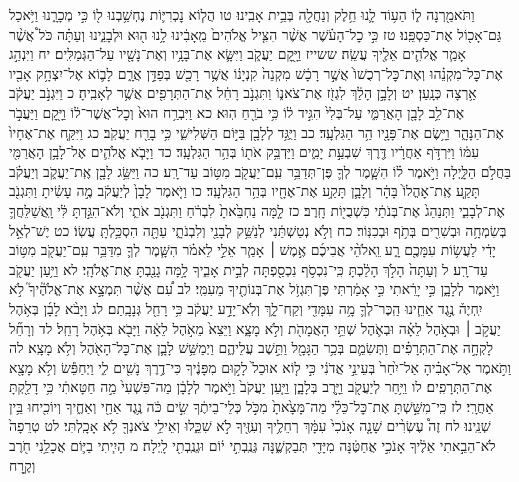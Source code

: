 \documentclass[twoside, openany, parskip=half, 11pt]{book}
\begin{document}
וַתֹּאמַ֖רְנָה ל֑וֹ הַע֥וֹד לָ֛נוּ חֵ֥לֶק וְנַחֲלָ֖ה בְּבֵ֥ית אָבִֽינוּ׃ טו הֲל֧וֹא נׇכְרִיּ֛וֹת נֶחְשַׁ֥בְנוּ ל֖וֹ כִּ֣י מְכָרָ֑נוּ וַיֹּ֥אכַל גַּם־אָכ֖וֹל אֶת־כַּסְפֵּֽנוּ׃ טז כִּ֣י כׇל־הָעֹ֗שֶׁר אֲשֶׁ֨ר הִצִּ֤יל אֱלֹהִים֙ מֵֽאָבִ֔ינוּ לָ֥נוּ ה֖וּא וּלְבָנֵ֑ינוּ וְעַתָּ֗ה כֹּל֩ אֲשֶׁ֨ר אָמַ֧ר אֱלֹהִ֛ים אֵלֶ֖יךָ עֲשֵֽׂה׃ ששייז וַיָּ֖קׇם יַעֲקֹ֑ב וַיִּשָּׂ֛א אֶת־בָּנָ֥יו וְאֶת־נָשָׁ֖יו עַל־הַגְּמַלִּֽים׃ יח וַיִּנְהַ֣ג אֶת־כׇּל־מִקְנֵ֗הוּ וְאֶת־כׇּל־רְכֻשׁוֹ֙ אֲשֶׁ֣ר רָכָ֔שׁ מִקְנֵה֙ קִנְיָנ֔וֹ אֲשֶׁ֥ר רָכַ֖שׁ בְּפַדַּ֣ן אֲרָ֑ם לָב֛וֹא אֶל־יִצְחָ֥ק אָבִ֖יו אַ֥רְצָה כְּנָֽעַן׃ יט וְלָבָ֣ן הָלַ֔ךְ לִגְזֹ֖ז אֶת־צֹאנ֑וֹ וַתִּגְנֹ֣ב רָחֵ֔ל אֶת־הַתְּרָפִ֖ים אֲשֶׁ֥ר לְאָבִֽיהָ׃ כ וַיִּגְנֹ֣ב יַעֲקֹ֔ב אֶת־לֵ֥ב לָבָ֖ן הָאֲרַמִּ֑י עַל־בְּלִי֙ הִגִּ֣יד ל֔וֹ כִּ֥י בֹרֵ֖חַ הֽוּא׃ כא וַיִּבְרַ֥ח הוּא֙ וְכׇל־אֲשֶׁר־ל֔וֹ וַיָּ֖קׇם וַיַּעֲבֹ֣ר אֶת־הַנָּהָ֑ר וַיָּ֥שֶׂם אֶת־פָּנָ֖יו הַ֥ר הַגִּלְעָֽד׃ כב וַיֻּגַּ֥ד לְלָבָ֖ן בַּיּ֣וֹם הַשְּׁלִישִׁ֑י כִּ֥י בָרַ֖ח יַעֲקֹֽב׃ כג וַיִּקַּ֤ח אֶת־אֶחָיו֙ עִמּ֔וֹ וַיִּרְדֹּ֣ף אַחֲרָ֔יו דֶּ֖רֶךְ שִׁבְעַ֣ת יָמִ֑ים וַיַּדְבֵּ֥ק אֹת֖וֹ בְּהַ֥ר הַגִּלְעָֽד׃ כד וַיָּבֹ֧א אֱלֹהִ֛ים אֶל־לָבָ֥ן הָאֲרַמִּ֖י בַּחֲלֹ֣ם הַלָּ֑יְלָה וַיֹּ֣אמֶר ל֗וֹ הִשָּׁ֧מֶר לְךָ֛ פֶּן־תְּדַבֵּ֥ר עִֽם־יַעֲקֹ֖ב מִטּ֥וֹב עַד־רָֽע׃ כה וַיַּשֵּׂ֥ג לָבָ֖ן אֶֽת־יַעֲקֹ֑ב וְיַעֲקֹ֗ב תָּקַ֤ע אֶֽת־אׇהֳלוֹ֙ בָּהָ֔ר וְלָבָ֛ן תָּקַ֥ע אֶת־אֶחָ֖יו בְּהַ֥ר הַגִּלְעָֽד׃ כו וַיֹּ֤אמֶר לָבָן֙ לְיַעֲקֹ֔ב מֶ֣ה עָשִׂ֔יתָ וַתִּגְנֹ֖ב אֶת־לְבָבִ֑י וַתְּנַהֵג֙ אֶת־בְּנֹתַ֔י כִּשְׁבֻי֖וֹת חָֽרֶב׃ כז לָ֤מָּה נַחְבֵּ֙אתָ֙ לִבְרֹ֔חַ וַתִּגְנֹ֖ב אֹתִ֑י וְלֹא־הִגַּ֣דְתָּ לִּ֔י וָֽאֲשַׁלֵּחֲךָ֛ בְּשִׂמְחָ֥ה וּבְשִׁרִ֖ים בְּתֹ֥ף וּבְכִנּֽוֹר׃ כח וְלֹ֣א נְטַשְׁתַּ֔נִי לְנַשֵּׁ֥ק לְבָנַ֖י וְלִבְנֹתָ֑י עַתָּ֖ה הִסְכַּ֥לְתָּֽ עֲשֽׂוֹ׃ כט יֶשׁ־לְאֵ֣ל יָדִ֔י לַעֲשׂ֥וֹת עִמָּכֶ֖ם רָ֑ע וֵֽאלֹהֵ֨י אֲבִיכֶ֜ם אֶ֣מֶשׁ ׀ אָמַ֧ר אֵלַ֣י לֵאמֹ֗ר הִשָּׁ֧מֶר לְךָ֛ מִדַּבֵּ֥ר עִֽם־יַעֲקֹ֖ב מִטּ֥וֹב עַד־רָֽע׃ ל וְעַתָּה֙ הָלֹ֣ךְ הָלַ֔כְתָּ כִּֽי־נִכְסֹ֥ף נִכְסַ֖פְתָּה לְבֵ֣ית אָבִ֑יךָ לָ֥מָּה גָנַ֖בְתָּ אֶת־אֱלֹהָֽי׃ לא וַיַּ֥עַן יַעֲקֹ֖ב וַיֹּ֣אמֶר לְלָבָ֑ן כִּ֣י יָרֵ֔אתִי כִּ֣י אָמַ֔רְתִּי פֶּן־תִּגְזֹ֥ל אֶת־בְּנוֹתֶ֖יךָ מֵעִמִּֽי׃ לב עִ֠ם אֲשֶׁ֨ר תִּמְצָ֣א אֶת־אֱלֹהֶ֘יךָ֮ לֹ֣א יִֽחְיֶה֒ נֶ֣גֶד אַחֵ֧ינוּ הַֽכֶּר־לְךָ֛ מָ֥ה עִמָּדִ֖י וְקַֽח־לָ֑ךְ וְלֹֽא־יָדַ֣ע יַעֲקֹ֔ב כִּ֥י רָחֵ֖ל גְּנָבָֽתַם׃ לג וַיָּבֹ֨א לָבָ֜ן בְּאֹ֥הֶל יַעֲקֹ֣ב ׀ וּבְאֹ֣הֶל לֵאָ֗ה וּבְאֹ֛הֶל שְׁתֵּ֥י הָאֲמָהֹ֖ת וְלֹ֣א מָצָ֑א וַיֵּצֵא֙ מֵאֹ֣הֶל לֵאָ֔ה וַיָּבֹ֖א בְּאֹ֥הֶל רָחֵֽל׃ לד וְרָחֵ֞ל לָקְחָ֣ה אֶת־הַתְּרָפִ֗ים וַתְּשִׂמֵ֛ם בְּכַ֥ר הַגָּמָ֖ל וַתֵּ֣שֶׁב עֲלֵיהֶ֑ם וַיְמַשֵּׁ֥שׁ לָבָ֛ן אֶת־כׇּל־הָאֹ֖הֶל וְלֹ֥א מָצָֽא׃ לה וַתֹּ֣אמֶר אֶל־אָבִ֗יהָ אַל־יִ֙חַר֙ בְּעֵינֵ֣י אֲדֹנִ֔י כִּ֣י ל֤וֹא אוּכַל֙ לָק֣וּם מִפָּנֶ֔יךָ כִּי־דֶ֥רֶךְ נָשִׁ֖ים לִ֑י וַיְחַפֵּ֕שׂ וְלֹ֥א מָצָ֖א אֶת־הַתְּרָפִֽים׃ לו וַיִּ֥חַר לְיַעֲקֹ֖ב וַיָּ֣רֶב בְּלָבָ֑ן וַיַּ֤עַן יַעֲקֹב֙ וַיֹּ֣אמֶר לְלָבָ֔ן מַה־פִּשְׁעִי֙ מַ֣ה חַטָּאתִ֔י כִּ֥י דָלַ֖קְתָּ אַחֲרָֽי׃ לז כִּֽי־מִשַּׁ֣שְׁתָּ אֶת־כׇּל־כֵּלַ֗י מַה־מָּצָ֙אתָ֙ מִכֹּ֣ל כְּלֵי־בֵיתֶ֔ךָ שִׂ֣ים כֹּ֔ה נֶ֥גֶד אַחַ֖י וְאַחֶ֑יךָ וְיוֹכִ֖יחוּ בֵּ֥ין שְׁנֵֽינוּ׃ לח זֶה֩ עֶשְׂרִ֨ים שָׁנָ֤ה אָנֹכִי֙ עִמָּ֔ךְ רְחֵלֶ֥יךָ וְעִזֶּ֖יךָ לֹ֣א שִׁכֵּ֑לוּ וְאֵילֵ֥י צֹאנְךָ֖ לֹ֥א אָכָֽלְתִּי׃ לט טְרֵפָה֙ לֹא־הֵבֵ֣אתִי אֵלֶ֔יךָ אָנֹכִ֣י אֲחַטֶּ֔נָּה מִיָּדִ֖י תְּבַקְשֶׁ֑נָּה גְּנֻֽבְתִ֣י י֔וֹם וּגְנֻֽבְתִ֖י לָֽיְלָה׃ מ הָיִ֧יתִי בַיּ֛וֹם אֲכָלַ֥נִי חֹ֖רֶב וְקֶ֣רַח 
\end{document}
